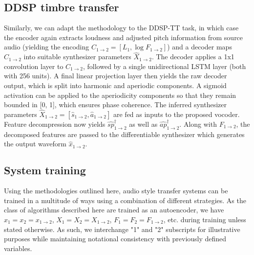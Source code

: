 \documentclass{article}
\begin{document}
\begin{sloppy}
\subsection{DDSP timbre transfer}
\label{ssec:ddsp}
Similarly, we can adapt the methodology to the DDSP-TT task, in which case the encoder again extracts loudness and adjusted pitch information from source audio (yielding the encoding $C_{1\rightarrow2} = \left[ L_1, \log{F_{1\rightarrow2}}\right]$) and a decoder maps $C_{1\rightarrow2}$ into suitable synthesizer parameters $\hat{X}_{1\rightarrow2}$.  The decoder applies a 1x1 convolution layer to $C_{1\rightarrow2}$, followed by a single unidirectional LSTM layer (both with 256 units).  A final linear projection layer then yields the raw decoder output, which is split into harmonic and aperiodic components.  A sigmoid activation can be applied to the aperiodicity components so that they remain bounded in [0, 1], which ensures phase coherence. The inferred synthesizer parameters $\hat{X}_{1\rightarrow2} = [\hat{s}_{1\rightarrow2}, \hat{a}_{1\rightarrow2}]$  are fed as inputs to the proposed vocoder.  Feature decompression now yields $\hat{sp}^\dagger_{1\rightarrow2}$ as well as $\hat{ap}^\dagger_{1\rightarrow2}$.  Along with $F_{1\rightarrow2}$, the decomposed features are passed to the differentiable synthesizer which generates the output waveform $\hat{x}_{1\rightarrow2}$.

\subsection{System training}
\label{ssec:system}
Using the methodologies outlined here, audio style transfer systems can be trained in a multitude of ways using a combination of different strategies.  As the class of algorithms described here are trained as an autoencoder, we have $x_1 = x_2 = x_{1\rightarrow2}$, $X_1 = X_2 = X_{1\rightarrow2}$, $F_1=F_2=F_{1\rightarrow2}$, etc. during training unless stated otherwise.  As such, we interchange "1" and "2" subscripts for illustrative purposes while maintaining notational consistency with previously defined variables.


\end{sloppy}
\end{document}
